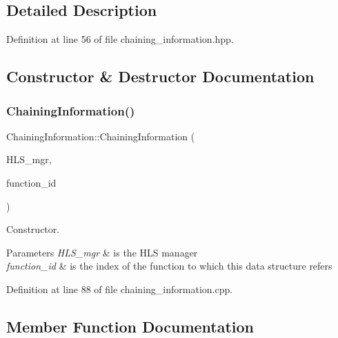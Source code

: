 \subsection{Detailed Description}


Definition at line 56 of file chaining\+\_\+information.\+hpp.



\subsection{Constructor \& Destructor Documentation}
\mbox{\label{classChainingInformation_a7fe5b29f1d89fdf1218e973dbc6c3e2b}} 
\subsubsection{\texorpdfstring{Chaining\+Information()}{ChainingInformation()}}
{\footnotesize\ttfamily Chaining\+Information\+::\+Chaining\+Information (\begin{DoxyParamCaption}\item[{const \hyperlink{hls__manager_8hpp_a1b481383e3beabc89bd7562ae672dd8c}{H\+L\+S\+\_\+manager\+Const\+Ref}}]{H\+L\+S\+\_\+mgr,  }\item[{const unsigned int}]{function\+\_\+id }\end{DoxyParamCaption})}



Constructor. 


\begin{DoxyParams}{Parameters}
{\em H\+L\+S\+\_\+mgr} & is the H\+LS manager \\
\hline
{\em function\+\_\+id} & is the index of the function to which this data structure refers \\
\hline
\end{DoxyParams}


Definition at line 88 of file chaining\+\_\+information.\+cpp.



\subsection{Member Function Documentation}
\mbox{\label{classChainingInformation_a0fdcde9a175528d1f79dcedc929edc8d}} 
